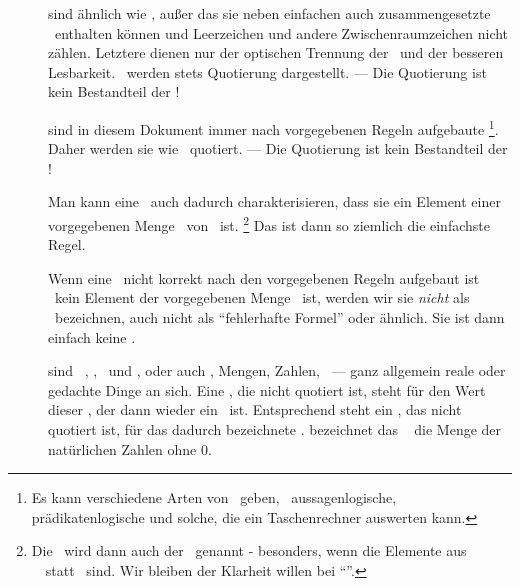 \begin{description}
	\item [\Zeichenfolgen] sind ähnlich wie \Zeichenketten, außer das sie neben einfachen auch zusammengesetzte \Symbole\ enthalten können und Leerzeichen und andere Zwischenraumzeichen nicht zählen.
	Letztere dienen nur der optischen Trennung der \Symbole\ und der besseren Lesbarkeit.
	\Zeichenfolgen\ werden stets  Quotierung dargestellt.
	--- Die Quotierung ist kein Bestandteil der \Zeichenfolge!

	\item [\Formeln] \label{def-Formel} sind in diesem Dokument immer nach vorgegebenen Regeln aufgebaute \Zeichenfolgen%
	\footnote{%
		Es kann verschiedene Arten von \Formeln\ geben, \textzB\ aussagenlogische, prädikatenlogische und solche, die ein Taschenrechner auswerten kann.
	}.
	Daher werden sie wie \Zeichenfolgen\ quotiert.
	--- Die Quotierung ist kein Bestandteil der \Zeichenfolge!

	Man kann eine \Formel\ auch dadurch charakterisieren, dass sie ein Element einer vorgegebenen Menge \MtsSprache\ von \Zeichenfolgen\ ist.%
	\footnote{%
		Die \Formel\ wird dann auch  der  \MtsSprache\ genannt - besonders, wenn die Elemente aus \MtsSprache\ \Zeichenketten\ statt \Zeichenfolgen\ sind.
		Wir bleiben der Klarheit willen bei "`\Formel"'.
	}
	Das ist dann so ziemlich die einfachste Regel.

	Wenn eine \Zeichenfolge\ nicht korrekt nach den vorgegebenen Regeln aufgebaut ist \textbzw\ kein Element der vorgegebenen Menge \MtsSprache\ ist, werden wir sie \emph{nicht} als \Formel\ bezeichnen, auch nicht als "`fehlerhafte Formel"' oder ähnlich.
	Sie ist dann einfach keine \Formel.

	\item [\Objekte] sind \textzB\ \Symbole, \Zeichenketten, \Zeichenfolgen\ und \Formeln, oder auch \Aussagen, Mengen, Zahlen, \textusw\ --- ganz allgemein reale oder gedachte Dinge an sich.
	Eine \Formel, die nicht quotiert ist, steht für den Wert dieser \Formel, der dann wieder ein \Objekt\ ist.
	Entsprechend steht ein \Symbol, das nicht quotiert ist, für das dadurch bezeichnete \Objekt.
	\textZB bezeichnet das \Symbol\ \chrqt{\MtsIN} die Menge \MtsIN der natürlichen Zahlen ohne 0.

\end{description}

